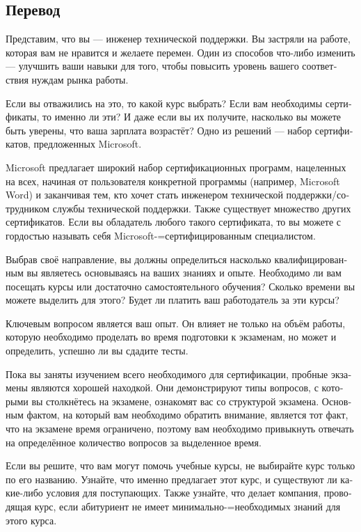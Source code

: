 \documentclass[a5paper,10pt,notitlepage,pdftex,headsepline]{scrartcl}
\begin{document}
  \subsection{Перевод}
    \begin{otherlanguage}{russian}
      Представим, что вы --- инженер технической поддержки.
      Вы застряли на работе, которая вам не нравится и желаете перемен.
      Один из способов что-либо изменить --- улучшить ваши навыки для того,
      чтобы повысить уровень вашего соответствия нуждам рынка работы.

      Если вы отважились на это, то какой курс выбрать?
      Если вам необходимы сертификаты, то именно ли эти?
      И даже если вы их получите, насколько вы можете быть уверены, что ваша
      зарплата возрастёт?
      Одно из решений --- набор сертификатов, предложенных Microsoft.

      Microsoft предлагает широкий набор сертификационных программ, нацеленных
      на всех, начиная от пользователя конкретной программы (например,
      Microsoft Word) и заканчивая тем, кто хочет стать инженером технической
      поддержки/сотрудником службы технической поддержки.
      Также существует множество других сертификатов.
      Если вы обладатель любого такого сертификата, то вы можете с гордостью
      называть себя Microsoft-=сертифицированным специалистом.

      Выбрав своё направление, вы должны определиться насколько
      квалифицированным вы являетесь основываясь на ваших знаниях и опыте.
      Необходимо ли вам посещать курсы или достаточно самостоятельного
      обучения?
      Сколько времени вы можете выделить для этого?
      Будет ли платить ваш работодатель за эти курсы?

      Ключевым вопросом является ваш опыт.
      Он влияет не только на объём работы, которую необходимо проделать во
      время подготовки к экзаменам, но может и определить, успешно ли вы
      сдадите тесты.

      Пока вы заняты изучением всего необходимого для сертификации, пробные
      экзамены являются хорошей находкой.
      Они демонстрируют типы вопросов, с которыми вы столкнётесь на экзамене,
      ознакомят вас со структурой экзамена.
      Основным фактом, на который вам необходимо обратить внимание, является
      тот факт, что на экзамене время ограничено, поэтому вам необходимо
      привыкнуть отвечать на определённое количество вопросов за выделенное
      время.

      Если вы решите, что вам могут помочь учебные курсы, не выбирайте курс
      только по его названию.
      Узнайте, что именно предлагает этот курс, и существуют ли какие-либо
      условия для поступающих.
      Также узнайте, что делает компания, проводящая курс, если абитуриент не
      имеет минимально-=необходимых знаний для этого курса.


\end{otherlanguage}
\end{document}
